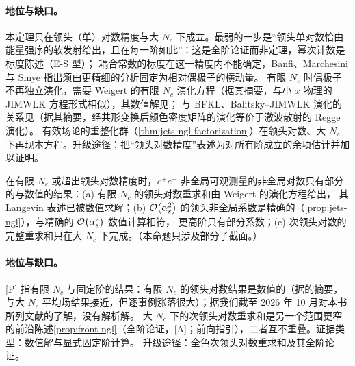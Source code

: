 \paragraph{地位与缺口。}
本定理只在领头（单）对数精度与大 $N_c$ 下成立。最弱的一步是“领头单对数恰由能量强序的软发射给出，且在每一阶如此”：这是全阶论证而非定理，幂次计数是标度陈述（E-S 型）；
耦合常数的标度在这一精度内不能确定，Banfi、Marchesini 与 Smye 指出须由更精细的分析固定为相对偶极子的横动量\cite[第~4~节]{Banfi:2002hw}。
有限 $N_c$ 时偶极子不再独立演化，需要 Weigert 的有限 $N_c$ 演化方程\cite{Weigert:2003mm}（据其摘要，与小 $x$ 物理的 JIMWLK 方程形式相似），其数值解见\cite{Hatta:2013iba}；
与 BFKL、Balitsky--JIMWLK 演化的关系见\cite{Caron-Huot:2015bja}（据其摘要，经共形变换后颜色密度矩阵的演化等价于激波散射的 Regge 演化）。
有效场论的重整化群（\cref{thm:jets-ngl-factorization}）在领头对数、大 $N_c$ 下再现本方程\cite{Becher:2016mmh}。升级途径：把“领头对数精度”表述为对所有阶成立的余项估计并加以证明。

\begin{proposition}\label{prop:jets-ngl-beyond}
在有限 $N_c$ 或超出领头对数精度时，$e^+e^-$ 非全局可观测量的非全局对数只有部分的与数值的结果：(a) 有限 $N_c$ 的领头对数重求和由 Weigert 的演化方程给出\cite{Weigert:2003mm}，
其 Langevin 表述已被数值求解\cite{Hatta:2013iba}；(b) $\mathcal{O}\!\left(\alpha_s^2\right)$ 的领头非全局系数是精确的（\cref{prop:jets-ngl}），与精确的 $\mathcal{O}\!\left(\alpha_s^2\right)$ 数值计算相符\cite[第~4~节]{DasguptaSalam2001}，
更高阶只有部分系数；(c) 次领头对数的完整重求和只在大 $N_c$ 下完成。（本命题只涉及部分子截面。）
\end{proposition}

\paragraph{地位与缺口。}
[P] 指有限 $N_c$ 与固定阶的结果：有限 $N_c$ 的领头对数结果是数值的（据\cite{Hatta:2013iba}的摘要，与大 $N_c$ 平均场结果接近，但逐事例涨落很大）；据我们截至 2026 年 10 月对本书所列文献的了解，没有解析解。
大 $N_c$ 下的次领头对数重求和是另一个范围更窄的前沿陈述\cref{prop:front-ngl}（全阶论证，[A]；前向指引），二者互不重叠。证据类型：数值解与显式固定阶计算。
升级途径：全色次领头对数重求和及其全阶论证。

